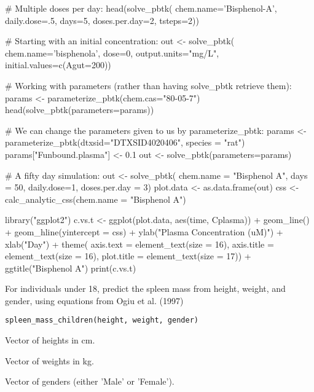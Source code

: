 \documentclass[a4paper]{book}
\begin{document}
\begin{Examples}
\begin{ExampleCode}

# Multiple doses per day:
head(solve_pbtk(
  chem.name='Bisphenol-A',
  daily.dose=.5,
  days=5,
  doses.per.day=2,
  tsteps=2))

# Starting with an initial concentration:
out <- solve_pbtk(
  chem.name='bisphenola',
  dose=0,
  output.units="mg/L", 
  initial.values=c(Agut=200))

# Working with parameters (rather than having solve_pbtk retrieve them):
params <- parameterize_pbtk(chem.cas="80-05-7")
head(solve_pbtk(parameters=params))
                  
# We can change the parameters given to us by parameterize_pbtk:
params <- parameterize_pbtk(dtxsid="DTXSID4020406", species = "rat")
params["Funbound.plasma"] <- 0.1
out <- solve_pbtk(parameters=params)


# A fifty day simulation:
out <- solve_pbtk(
  chem.name = "Bisphenol A", 
  days = 50, 
  daily.dose=1,
  doses.per.day = 3)
plot.data <- as.data.frame(out)
css <- calc_analytic_css(chem.name = "Bisphenol A")

library("ggplot2")
c.vs.t <- ggplot(plot.data, aes(time, Cplasma)) + 
  geom_line() +
  geom_hline(yintercept = css) + 
  ylab("Plasma Concentration (uM)") +
  xlab("Day") + 
  theme(
    axis.text = element_text(size = 16), 
    axis.title = element_text(size = 16), 
    plot.title = element_text(size = 17)) +
  ggtitle("Bisphenol A")
print(c.vs.t)


\end{ExampleCode}
\end{Examples}
%
\begin{Description}\relax
For individuals under 18, predict the spleen mass from height, weight, and
gender, using equations from Ogiu et al. (1997)
\end{Description}
%
\begin{Usage}
\begin{verbatim}
spleen_mass_children(height, weight, gender)
\end{verbatim}
\end{Usage}
%
\begin{Arguments}
\begin{ldescription}
\item[\code{height}] Vector of heights in cm.

\item[\code{weight}] Vector of weights in kg.

\item[\code{gender}] Vector of genders (either 'Male' or 'Female').
\end{ldescription}
\end{Arguments}
\end{document}

